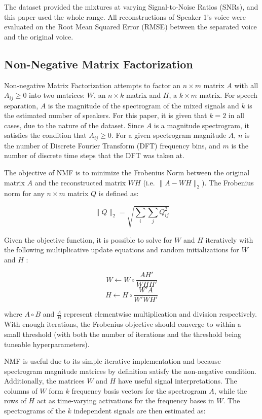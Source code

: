 \documentclass[12pt,chapterheads]{ucsd}
\begin{document}
The dataset provided the mixtures at varying Signal-to-Noise Ratios (SNRs), and this paper used the whole range. All reconstructions of Speaker 1's voice were evaluated on the Root Mean Squared Error (RMSE) between the separated voice and the original voice.

\subsection{Non-Negative Matrix Factorization}
Non-negative Matrix Factorization attempts to factor an $n \times m$ matrix $A$ with all $A_{ij} \geq 0$ into two matrices: $W$, an $n \times k$ matrix and $H$, a $k \times m$ matrix. For speech separation, $A$ is the magnitude of the spectrogram of the mixed signals and $k$ is the estimated number of speakers. For this paper, it is given that $k=2$ in all cases, due to the nature of the dataset. Since $A$ is a magnitude spectrogram, it satisfies the condition that $A_{ij} \geq 0$. For a given spectrogram magnitude $A$, $n$ is the number of Discrete Fourier Transform (DFT) frequency bins, and $m$ is the number of discrete time steps that the DFT was taken at.

The objective of NMF is to minimize the Frobenius Norm between the original matrix $A$ and the reconstructed matrix $WH$ (i.e. $\| A - WH\|_2$). The Frobenius norm for any $n \times m$ matrix $Q$ is defined as:

\begin{equation}
\| Q \|_2 = \sqrt{\sum\limits_{i} \sum\limits_{j} Q_{ij}^2}
\end{equation}

Given the objective function, it is possible to solve for $W$ and $H$ iteratively with the following multiplicative update equations and random initializations for $W$ and $H$ \cite{Lee00algorithmsfor}:

\begin{equation}
W \leftarrow W \circ \frac{AH'}{WHH'}
\end{equation}
\begin{equation}
H \leftarrow H \circ \frac{W'A}{W'WH'}
\end{equation}

\noindent where $A \circ B$ and $\frac{A}{B}$ represent elementwise multiplication and division respectively. With enough iterations, the Frobenius objective should converge to within a small threshold (with both the number of iterations and the threshold being tuneable hyperparameters).

NMF is useful due to its simple iterative implementation and because spectrogram magnitude matrices by definition satisfy the non-negative condition.  Additionally, the matrices $W$ and $H$ have useful signal interpretations. The columns of $W$ form $k$ frequency basis vectors for the spectrogram $A$, while the rows of $H$ act as time-varying activations for the frequency bases in $W$. The spectrograms of the $k$ independent signals are then estimated as:
\end{document}

